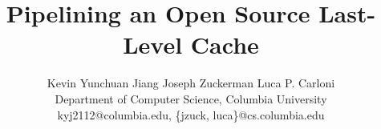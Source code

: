 \documentclass{sig-alternate}
\begin{document}
\title{Pipelining an Open Source Last-Level Cache}

\author{
Kevin Yunchuan Jiang \qquad Joseph Zuckerman \qquad Luca P. Carloni \\
Department of Computer Science, Columbia University \\
kyj2112@columbia.edu, \{jzuck, luca\}@cs.columbia.edu 
}

\vspace{-2cm}

\maketitle

\vspace{-2cm}



\pagebreak


\end{document}

